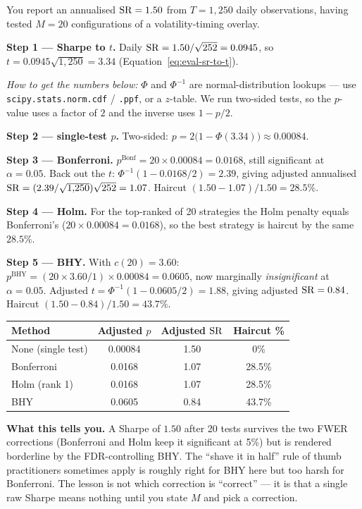 \begin{workedexample}
You report an annualised $\operatorname{SR} = 1.50$ from $T = 1{,}250$ daily observations, having tested $M = 20$ configurations of a volatility-timing overlay.

\textbf{Step 1 --- Sharpe to $t$.} Daily $\operatorname{SR} = 1.50/\sqrt{252} = 0.0945$, so $t = 0.0945\sqrt{1{,}250} = 3.34$ (Equation~\eqref{eq:eval-sr-to-t}).

\textit{How to get the numbers below:} $\Phi$ and $\Phi^{-1}$ are normal-distribution lookups --- use \texttt{scipy.stats.norm.cdf} / \texttt{.ppf}, or a $z$-table. We run two-sided tests, so the $p$-value uses a factor of $2$ and the inverse uses $1 - p/2$.

\textbf{Step 2 --- single-test $p$.} Two-sided: $p = 2\bigl(1 - \Phi(3.34)\bigr) \approx 0.00084$.

\textbf{Step 3 --- Bonferroni.} $p^{\text{Bonf}} = 20 \times 0.00084 = 0.0168$, still significant at $\alpha = 0.05$. Back out the $t$: $\Phi^{-1}(1 - 0.0168/2) = 2.39$, giving adjusted annualised $\operatorname{SR} = (2.39/\sqrt{1{,}250})\sqrt{252} = 1.07$. Haircut $(1.50 - 1.07)/1.50 = 28.5\%$.

\textbf{Step 4 --- Holm.} For the top-ranked of 20 strategies the Holm penalty equals Bonferroni's ($20 \times 0.00084 = 0.0168$), so the best strategy is haircut by the same $28.5\%$.

\textbf{Step 5 --- BHY.} With $c(20) = 3.60$: $p^{\text{BHY}} = (20 \times 3.60 / 1)\times 0.00084 = 0.0605$, now marginally \emph{insignificant} at $\alpha = 0.05$. Adjusted $t = \Phi^{-1}(1 - 0.0605/2) = 1.88$, giving adjusted $\operatorname{SR} = 0.84$. Haircut $(1.50 - 0.84)/1.50 = 43.7\%$.

\medskip
\begin{center}
\begin{tabular}{lccc}
\toprule
\textbf{Method} & \textbf{Adjusted $p$} & \textbf{Adjusted $\operatorname{SR}$} & \textbf{Haircut \%} \\
\midrule
None (single test) & 0.00084 & 1.50 & 0\% \\
Bonferroni & 0.0168 & 1.07 & 28.5\% \\
Holm (rank 1) & 0.0168 & 1.07 & 28.5\% \\
BHY & 0.0605 & 0.84 & 43.7\% \\
\bottomrule
\end{tabular}
\end{center}
\medskip

\textbf{What this tells you.}
A Sharpe of $1.50$ after 20 tests survives the two FWER corrections (Bonferroni and Holm keep it significant at 5\%) but is rendered borderline by the FDR-controlling BHY.
The ``shave it in half'' rule of thumb practitioners sometimes apply is roughly right for BHY here but too harsh for Bonferroni.
The lesson is not which correction is ``correct'' --- it is that a single raw Sharpe means nothing until you state $M$ and pick a correction.
\end{workedexample}


